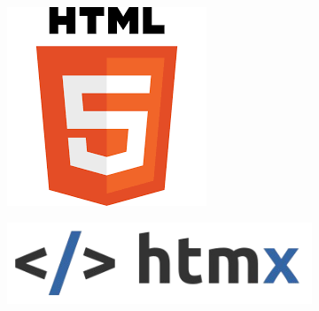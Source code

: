 \begin{figure}[h!]
  \centering
  \begin{subfigure}[b]{0.15\textwidth}
    \includegraphics[width=\textwidth]{Images/html.png}
    \label{fig:html5}
  \end{subfigure}
  \hfill
  \begin{subfigure}[b]{0.2\textwidth}
    \includegraphics[width=\textwidth]{Images/Htmx_Logo.png}
    \label{fig:htmx}
  \end{subfigure}
  \hfill
  \begin{subfigure}[b]{0.1\textwidth}

\end{subfigure}
\end{figure}
